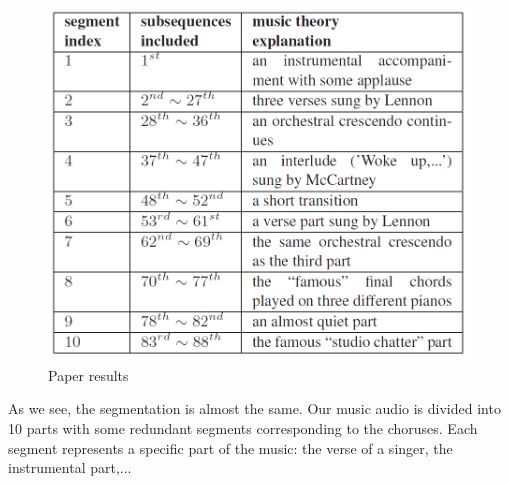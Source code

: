 \begin{figure}[h]
    \label{fig:segmentation}
    \centering
  	\includegraphics[scale=0.32]{Graphics/segmentation.PNG} 
   	\caption{Paper results}
\end{figure}

As we see, the segmentation is almost the same. Our music audio is divided into 10 parts with some redundant segments corresponding to the choruses. Each segment represents a specific part of the music: the verse of a singer, the instrumental part,... 